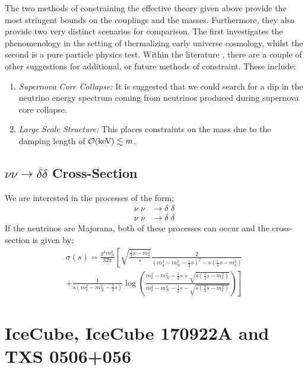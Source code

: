 The two methods of constraining the effective theory given above provide the most stringent bounds on the couplings and the masses. Furthermore, they also provide two very distinct scenarios for comparison. The first investigates the phenomenology in the setting of thermalizing early universe cosmology, whilst the second is a pure particle physics test. Within the literature \cite{Farzan2010, Boehm2006}, there are a couple of other suggestions for additional, or future methods of constraint. These include;
\begin{enumerate}
  \item \textit{Supernova Core Collapse:} It is suggested \cite{Franarin2018, Farzan2010} that we could search for a dip in the neutrino energy spectrum coming from neutrinos produced during supernova core collapse.
  \item \textit{Large Scale Structure:} This places constraints on the mass \cite{Boehm2004} due to the damping length of $\mathcal{O}(\text{keV}) \lesssim m$.
\end{enumerate}
\subsection{$\nu\nu \rightarrow \delta\delta$ Cross-Section}\label{sec:crosssection}
We are interested in the processes of the form;
\begin{align*}
\nu \,\, \nu &\longrightarrow \delta \,\, \delta\\
\nu \,\, \overline{\nu} &\longrightarrow \delta \,\, \delta
\end{align*}
If the neutrinos are Majorana, both of these processes can occur and the cross-section is given by;
\begin{multline}
\label{eq:sigma}
\sigma(s) = \frac{g^4 m_N^2}{32 \pi}\left[\sqrt{\frac{\frac{1}{4}s - m_\delta^2}{s}}\frac{2}{\left(m_\delta^2 - m_N^2 - \frac{1}{2}s\right)^2 - s\left(\frac{1}{4}s - m_\delta^2\right)} \right. \\ \left. + \frac{1}{s\left(m_\delta^2 - m_N^2 - \frac{1}{2}s\right)}\log\left(\frac{m_\delta^2 - m_N^2 - \frac{1}{2}s + \sqrt{s\left(\frac{1}{4}s - m_\delta^2\right)}}{m_\delta^2 - m_N^2 - \frac{1}{2}s - \sqrt{s\left(\frac{1}{4}s - m_\delta^2\right)}}\right)\right]
\end{multline}

\vspace{-1cm}

\section{IceCube, IceCube 170922A and TXS 0506+056}


